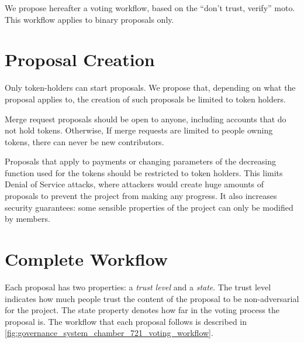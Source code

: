 We propose hereafter a voting workflow, based on the \enquote{don't trust, verify} moto.
This workflow applies to binary proposals only.

\section{Proposal Creation}

Only token-holders can start proposals.
We propose that, depending on what the proposal applies to, the creation of such proposals be limited to token holders.

Merge request proposals should be open to anyone, including accounts that do not hold tokens.
Otherwise, If merge requests are limited to people owning tokens, there can never be new contributors.

Proposals that apply to payments or changing parameters of the decreasing function used for the tokens should be restricted to token holders.
This limits Denial of Service attacks, where attackers would create huge amounts of proposals to prevent the project from making any progress.
It also increases security guarantees: some sensible properties of the project can only be modified by members.

\section{Complete Workflow}

Each proposal has two properties: a \textit{trust level} and a \textit{state}.
The trust level indicates how much people trust the content of the proposal to be non-adversarial for the project.
The state property denotes how far in the voting process the proposal is.
The workflow that each proposal follows is described in \cref{fig:governance_system_chamber_721_voting_workflow}.

